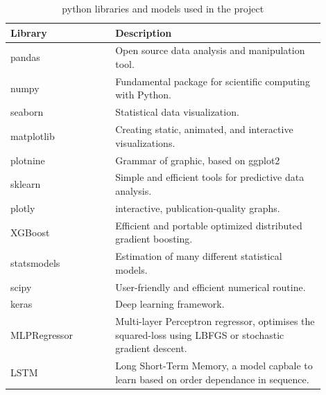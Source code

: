 \documentclass[mstat,12pt]{unswthesis}
\begin{document}
\begin{table}[H]
\centering
\begin{tabular}{p{0.3\linewidth} | p{0.6\linewidth}} 
\hline\hline
\textbf{Library}      & \textbf{Description}                                                                                                                         \\ 
\hline\hline
pandas                & Open source data analysis and manipulation tool.                                                                                             \\
numpy                 & Fundamental package for scientific computing with Python.                                                                                    \\
seaborn               & Statistical data visualization.                                                                                                              \\
matplotlib            & Creating static, animated, and interactive visualizations.                                                                                   \\
plotnine              & Grammar of graphic, based on ggplot2                                                                                                         \\
sklearn               & Simple and efficient tools for predictive data analysis.                                                                                     \\
plotly                & interactive, publication-quality graphs.                                                                                                     \\
XGBoost               & Efficient and portable optimized distributed gradient boosting.                                                                              \\
statsmodels           & Estimation of many different statistical models.                                                                                             \\
scipy                 & User-friendly and efficient numerical routine.                                                                                               \\
keras                 & Deep learning framework.                                                                                                                     \\
MLPRegressor~         & Multi-layer Perceptron regressor, optimises the squared-loss using LBFGS or stochastic gradient descent.                                     \\

LSTM       & Long Short-Term Memory, a model capbale to learn based on order dependance in sequence.                            \\

\hline\hline
\end{tabular}
\caption{python libraries and models used in the project}
\label{tab:python}
\end{table}
\end{document}
